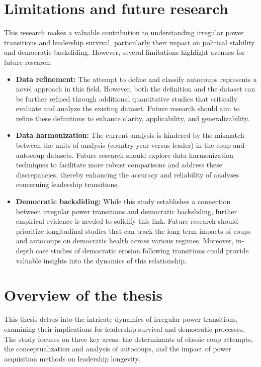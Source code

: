 \documentclass[
  12pt,
]{report}
\begin{document}
\section{Limitations and future
research}\label{limitations-and-future-research}

This research makes a valuable contribution to understanding irregular
power transitions and leadership survival, particularly their impact on
political stability and democratic backsliding. However, several
limitations highlight avenues for future research:

\begin{itemize}
\item
  \textbf{Data refinement:} The attempt to define and classify autocoups
  represents a novel approach in this field. However, both the
  definition and the dataset can be further refined through additional
  quantitative studies that critically evaluate and analyze the existing
  dataset. Future research should aim to refine these definitions to
  enhance clarity, applicability, and generalizability.
\item
  \textbf{Data harmonization:} The current analysis is hindered by the
  mismatch between the units of analysis (country-year versus leader) in
  the coup and autocoup datasets. Future research should explore data
  harmonization techniques to facilitate more robust comparisons and
  address these discrepancies, thereby enhancing the accuracy and
  reliability of analyses concerning leadership transitions.
\item
  \textbf{Democratic backsliding:} While this study establishes a
  connection between irregular power transitions and democratic
  backsliding, further empirical evidence is needed to solidify this
  link. Future research should prioritize longitudinal studies that can
  track the long-term impacts of coups and autocoups on democratic
  health across various regimes. Moreover, in-depth case studies of
  democratic erosion following transitions could provide valuable
  insights into the dynamics of this relationship.
\end{itemize}

\section{Overview of the thesis}\label{overview-of-the-thesis}

This thesis delves into the intricate dynamics of irregular power
transitions, examining their implications for leadership survival and
democratic processes. The study focuses on three key areas: the
determinants of classic coup attempts, the conceptualization and
analysis of autocoups, and the impact of power acquisition methods on
leadership longevity.
\end{document}
